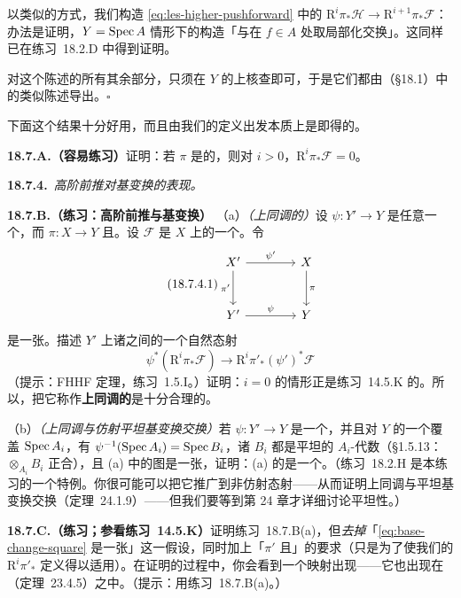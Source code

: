 以类似的方式，我们构造 \eqref{eq:les-higher-pushforward} 中的\trConnectingHomomorphism{} $\mathrm{R}^i\pi_*\mathscr{H}\to\mathrm{R}^{i+1}\pi_*\mathscr{F}$：办法是证明，$Y=\operatorname{Spec} A$ 情形下的构造「与在 $f\in A$ 处取局部化交换」。这同样已在\mbox{练习~18.2.D} 中得到证明。

对这个陈述的所有其余部分，只须在 $Y$ 的\trAffine\trOpenSubset{}上核查即可，于是它们都由\trCechCohomology（\S18.1）中的类似陈述导出。\hfill$\square$

下面这个结果十分好用，而且由我们的定义出发本质上是即得的。

\textbf{18.7.A.（容易练习）}\quad 证明：若 $\pi$ 是\trAffine{}的，则对 $i>0$，$\mathrm{R}^i\pi_*\mathscr{F}=0$。

\textbf{18.7.4.}\ \emph{高阶前推对基变换的表现。}

\textbf{18.7.B.（练习：高阶前推与基变换）}\quad
（a）\emph{（上同调的\trPushPullMap）}设 $\psi\colon Y'\to Y$ 是任意一个\trMorphism，而 $\pi\colon X\to Y$ \trQuasicompact{}且\trSeparated。设 $\mathscr{F}$ 是 $X$ 上的一个\trQCSheaf。令
\begin{equation*}\tag{18.7.4.1}\label{eq:base-change-square}
\begin{tikzcd}[row sep=2.8em, column sep=4em]
X' \ar[r, "\psi'"] \ar[d, "\pi'"'] & X \ar[d, "\pi"] \\
Y' \ar[r, "\psi"] & Y
\end{tikzcd}
\end{equation*}
是一张\trCartesianDiagram。描述 $Y'$ 上诸\trQCSheaf{}之间的一个自然态射
\[
\psi^*(\mathrm{R}^i\pi_*\mathscr{F})\longrightarrow\mathrm{R}^i\pi'_*(\psi')^*\mathscr{F}
\]
（提示：FHHF 定理，\mbox{练习~1.5.I}。）证明：$i=0$ 的情形正是\mbox{练习~14.5.K} 的\trPushPullMap。所以，把它称作\textbf{上同调的\trPushPullMap}是十分合理的。

（b）\emph{（上同调与仿射平坦基变换交换）}若 $\psi\colon Y'\to Y$ 是一个\trAffine\trMorphism，并且对 $Y$ 的一个覆盖 $\operatorname{Spec} A_i$，有 $\psi^{-1}(\operatorname{Spec} A_i)=\operatorname{Spec} B_i$，诸 $B_i$ 都是平坦的 $A_i$-代数（\S1.5.13：$\otimes_{A_i}B_i$ 正合），且 (a) 中的图是一张\trCartesianDiagram，证明：(a) 的\trPushPullMap{}是一个\trIsomorphism。（\mbox{练习~18.2.H} 是本练习的一个特例。你很可能可以把它推广到非仿射态射——从而证明上同调与平坦基变换交换（\mbox{定理~24.1.9}）——但我们要等到第 24 章才详细讨论平坦性。）

\textbf{18.7.C.（练习；参看\mbox{练习~14.5.K}）}\quad 证明\mbox{练习~18.7.B(a)}，但\emph{去掉}「\eqref{eq:base-change-square} 是一张\trCartesianDiagram」这一假设，同时加上「$\pi'$ \trQuasicompact{}且\trSeparated」的要求（只是为了使我们的 $\mathrm{R}^i\pi'_*$ 定义得以适用）。在证明的过程中，你会看到一个映射出现——它也出现在\trLeray\trSpectralSequence（\mbox{定理~23.4.5}）之中。（提示：用\mbox{练习~18.7.B(a)}。）

